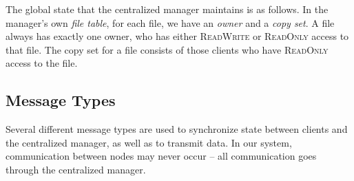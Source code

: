\documentclass[12pt]{article}	%
\begin{document}
The global state that the centralized manager maintains is as follows. In the manager's own \emph{file table}, for each file, we have an \emph{owner} and a \emph{copy set}. A file always has exactly one owner, who has either \textsc{ReadWrite} or \textsc{ReadOnly} access to that file. The copy set for a file consists of those clients who have \textsc{ReadOnly} access to the file.

\subsection{Message Types}

Several different message types are used to synchronize state between clients and the centralized manager, as well as to transmit data. In our system, communication between nodes may never occur -- all communication goes through the centralized manager.
\end{document}
